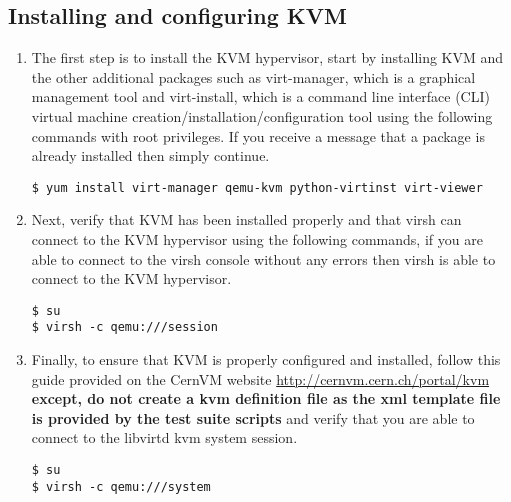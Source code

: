 \subsection{Installing and configuring KVM}
\label{sec:rhkvm}
\begin{enumerate}
\item	The first step is to install the KVM hypervisor, start by installing KVM and the other additional packages such
		as virt-manager, which is a graphical management tool and virt-install, which is a command line interface (CLI)
		virtual machine creation/installation/configuration tool using the following commands with root privileges. If
		you receive a message that a package is already installed then simply continue.

\lstset{language=bash,caption=Installing KVM and Other Related Programs}
\begin{lstlisting}
$ yum install virt-manager qemu-kvm python-virtinst virt-viewer
\end{lstlisting}

\item	Next, verify that KVM has been installed properly and that virsh can connect to the KVM hypervisor using the
		following commands, if you are able to connect to the virsh console without any errors then virsh is able
		to connect to the KVM hypervisor.

\lstset{language=bash,caption=Verify that virsh can Access KVM}
\begin{lstlisting}
$ su
$ virsh -c qemu:///session
\end{lstlisting}

\item 	Finally, to ensure that KVM is properly configured and installed, follow this guide provided on the CernVM website
		\url{http://cernvm.cern.ch/portal/kvm} {\bf except, do not create a kvm definition file as the xml template file
		is provided by the test suite scripts} and verify that you are able to connect to the libvirtd kvm system session.
		
\lstset{language=bash,caption=Verify that KVM is Properly Configured}
\begin{lstlisting}
$ su
$ virsh -c qemu:///system 
\end{lstlisting}
\end{enumerate}




\newpage
